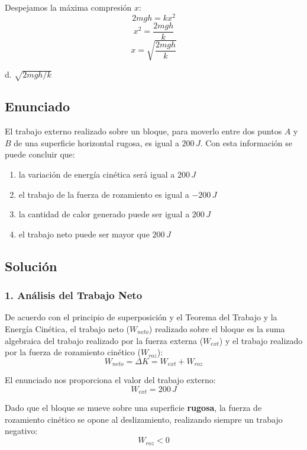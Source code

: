 \documentclass[12pt, a4paper]{article}
\begin{document}
Despejamos la máxima compresión $x$:
$$2mgh = k x^2$$
$$x^2 = \frac{2mgh}{k}$$
$$x = \sqrt{\frac{2mgh}{k}}$$

\begin{tcolorbox}[colback=green!5!white, colframe=green!50!black, title=Respuesta Correcta]
\centering \Large d. $\sqrt{2mgh/k}$
\end{tcolorbox}

\newpage

\subsection*{Enunciado}
El trabajo externo realizado sobre un bloque, para moverlo entre dos puntos $A$ y $B$ de una superficie horizontal rugosa, es igual a $200 \, \si{J}$. Con esta información se puede concluir que:
\begin{enumerate}[label=\alph*.]
    \item la variación de energía cinética será igual a $200 \, \si{J}$
    \item el trabajo de la fuerza de rozamiento es igual a $-200 \, \si{J}$
    \item la cantidad de calor generado puede ser igual a $200 \, \si{J}$
    \item el trabajo neto puede ser mayor que $200 \, \si{J}$
\end{enumerate}

\subsection*{Solución}

\subsubsection*{1. Análisis del Trabajo Neto}
De acuerdo con el principio de superposición y el Teorema del Trabajo y la Energía Cinética, el trabajo neto ($W_{neto}$) realizado sobre el bloque es la suma algebraica del trabajo realizado por la fuerza externa ($W_{ext}$) y el trabajo realizado por la fuerza de rozamiento cinético ($W_{roz}$):
$$W_{neto} = \Delta K = W_{ext} + W_{roz}$$

El enunciado nos proporciona el valor del trabajo externo:
$$W_{ext} = 200 \, \si{J}$$

Dado que el bloque se mueve sobre una superficie \textbf{rugosa}, la fuerza de rozamiento cinético se opone al deslizamiento, realizando siempre un trabajo negativo:
$$W_{roz} < 0$$
\end{document}
